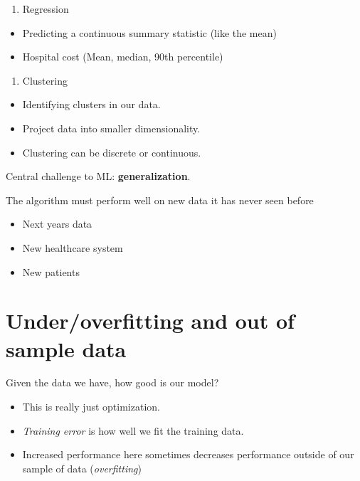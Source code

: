 \documentclass[fontset=fandol,zihao=false,scheme=chinese,heading=true,UTF8]{ctexbook}
\providecommand{\tightlist}{%
  \setlength{\itemsep}{0pt}\setlength{\parskip}{0pt}}
\begin{document}
\begin{enumerate}
\def\labelenumi{\arabic{enumi}.}
\setcounter{enumi}{1}
\tightlist
\item
  Regression
\end{enumerate}

\begin{itemize}
\tightlist
\item
  Predicting a continuous summary statistic (like the mean)
\item
  Hospital cost (Mean, median, 90th percentile)
\end{itemize}

\begin{enumerate}
\def\labelenumi{\arabic{enumi}.}
\setcounter{enumi}{2}
\tightlist
\item
  Clustering
\end{enumerate}

\begin{itemize}
\tightlist
\item
  Identifying clusters in our data.
\item
  Project data into smaller dimensionality.
\item
  Clustering can be discrete or continuous.
\end{itemize}

Central challenge to ML: \textbf{generalization}.

The algorithm must perform well on new data it has never seen before

\begin{itemize}
\tightlist
\item
  Next years data
\item
  New healthcare system
\item
  New patients
\end{itemize}

\hypertarget{underoverfitting-and-out-of-sample-data}{%
\section{Under/overfitting and out of sample data}\label{underoverfitting-and-out-of-sample-data}}

Given the data we have, how good is our model?

\begin{itemize}
\tightlist
\item
  This is really just optimization.
\item
  \emph{Training error} is how well we fit the training data.
\item
  Increased performance here sometimes decreases performance outside of our sample of data (\emph{overfitting})
\end{itemize}
\end{document}
